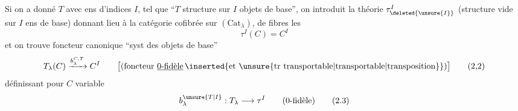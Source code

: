  Si on a donné $T$ avec ens d'indices $I$, tel que
``$T$ structure sur $I$ objets de base'', on introduit la
théorie $\tau_{\deleted{\unsure{I}}}^{I}$ (structure vide sur $I$ ens de base)
donnant lieu à la catégorie cofibrée sur $(\mathrm{Cat}_{\lambda})$, de fibres les
\[
\tau^I(C)=C^I\tag*{(2.1)}
\]
et on trouve   foncteur canonique ``syst des objets
de base''
\[
T_{\lambda}(C)\xrightarrow{b_{\lambda}^{C,T}}C^{I}\qquad
\bigl[(\text{foncteur }\underline{\text{0-fidèle}}\,\inserted{\text{et }\unsure{\text{tr transportable}|\text{transportable}|\text{transposition}}})\bigr]\tag*{(2,2)}
\]
définissant pour $C$ variable
\[
b_{\lambda}^{\unsure{T|I}}:T_{\lambda}\longrightarrow\tau^{I}\qquad(\text{0-fidèle})\tag*{(2.3)}
\]
